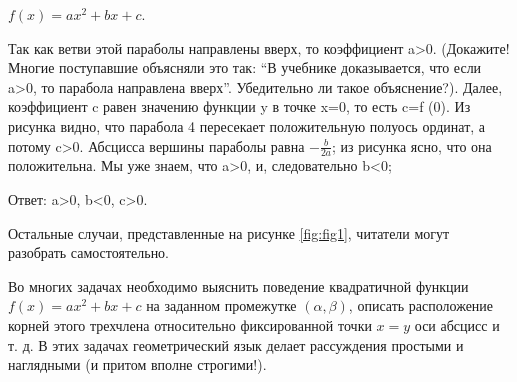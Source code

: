 \documentclass[main.tex]{subfiles}
\begin{document}
\begin{center}
$f (x) = ax^{2} + bx + c$.
\end{center}

\noindent Так как ветви этой параболы направлены вверх, то коэффициент a>0. (Докажите! Многие поступавшие объясняли это так: ``В учебнике доказывается, что если a>0, то парабола направлена вверх''. Убедительно ли такое объяснение?). Далее, коэффициент c равен значению функции y в точке x=0, то есть c=f (0). Из рисунка видно, что парабола 4 пересекает положительную полуось ординат, а потому c>0. Абсцисса вершины параболы равна $-\frac{b}{2a}$; из рисунка ясно, что она положительна. Мы уже знаем, что a>0, и, следовательно b<0;

Ответ: a>0, b<0, c>0.

Остальные случаи, представленные на рисунке \ref{fig:fig1}, читатели могут разобрать самостоятельно.

Во многих задачах необходимо выяснить поведение квадратичной функции $f (x) = ax^{2} + bx + c$ на заданном промежутке $(\alpha, \beta)$, описать расположение корней этого трехчлена относительно фиксированной точки $x=y$ оси абсцисс и т. д. В этих задачах геометрический язык делает рассуждения простыми и наглядными (и притом вполне строгими!).
\end{document}
